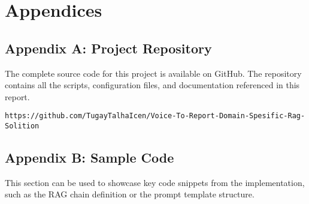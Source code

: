 \chapter*{Appendices}

\section*{Appendix A: Project Repository}

The complete source code for this project is available on GitHub. The repository contains all the scripts, configuration files, and documentation referenced in this report.

\begin{verbatim}
https://github.com/TugayTalhaIcen/Voice-To-Report-Domain-Spesific-Rag-Solition
\end{verbatim}

\section*{Appendix B: Sample Code}

This section can be used to showcase key code snippets from the implementation, such as the RAG chain definition or the prompt template structure.